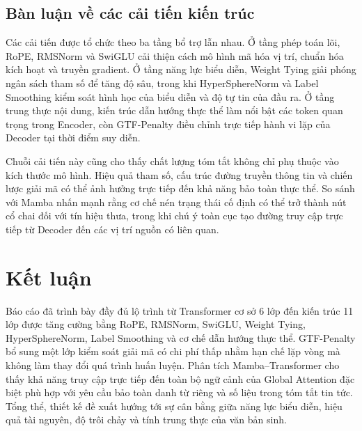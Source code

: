 \documentclass[11pt,a4paper]{article}
\numberwithin{equation}{section}
\begin{document}
\subsection{Bàn luận về các cải tiến kiến trúc}

Các cải tiến được tổ chức theo ba tầng bổ trợ lẫn nhau. Ở tầng phép toán lõi, RoPE, RMSNorm và SwiGLU cải thiện cách mô hình mã hóa vị trí, chuẩn hóa kích hoạt và truyền gradient. Ở tầng năng lực biểu diễn, Weight Tying giải phóng ngân sách tham số để tăng độ sâu, trong khi HyperSphereNorm và Label Smoothing kiểm soát hình học của biểu diễn và độ tự tin của đầu ra. Ở tầng trung thực nội dung, kiến trúc dẫn hướng thực thể làm nổi bật các token quan trọng trong Encoder, còn GTF-Penalty điều chỉnh trực tiếp hành vi lặp của Decoder tại thời điểm suy diễn.

Chuỗi cải tiến này cũng cho thấy chất lượng tóm tắt không chỉ phụ thuộc vào kích thước mô hình. Hiệu quả tham số, cấu trúc đường truyền thông tin và chiến lược giải mã có thể ảnh hưởng trực tiếp đến khả năng bảo toàn thực thể. So sánh với Mamba nhấn mạnh rằng cơ chế nén trạng thái cố định có thể trở thành nút cổ chai đối với tín hiệu thưa, trong khi chú ý toàn cục tạo đường truy cập trực tiếp từ Decoder đến các vị trí nguồn có liên quan.

\section{Kết luận}

Báo cáo đã trình bày đầy đủ lộ trình từ Transformer cơ sở 6 lớp đến kiến trúc 11 lớp được tăng cường bằng RoPE, RMSNorm, SwiGLU, Weight Tying, HyperSphereNorm, Label Smoothing và cơ chế dẫn hướng thực thể. GTF-Penalty bổ sung một lớp kiểm soát giải mã có chi phí thấp nhằm hạn chế lặp vòng mà không làm thay đổi quá trình huấn luyện. Phân tích Mamba--Transformer cho thấy khả năng truy cập trực tiếp đến toàn bộ ngữ cảnh của Global Attention đặc biệt phù hợp với yêu cầu bảo toàn danh từ riêng và số liệu trong tóm tắt tin tức. Tổng thể, thiết kế đề xuất hướng tới sự cân bằng giữa năng lực biểu diễn, hiệu quả tài nguyên, độ trôi chảy và tính trung thực của văn bản sinh.
\end{document}
